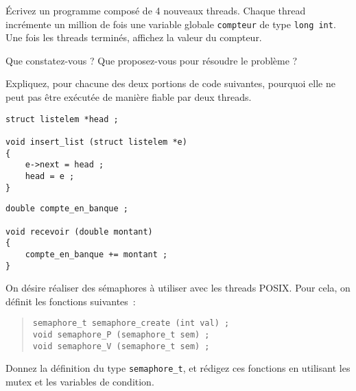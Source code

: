 \question	%

Écrivez un programme composé de 4 nouveaux threads. Chaque thread
incrémente un million de fois une variable globale \texttt {compteur}
de type \texttt {long int}. Une fois les threads terminés, affichez
la valeur du compteur.

Que constatez-vous ? Que proposez-vous pour résoudre le problème ?


\question

Expliquez, pour chacune des deux portions de code suivantes, pourquoi
elle ne peut pas être exécutée de manière fiable par deux threads.

\hfill
\begin {minipage} [t] {0.45\linewidth}
    \small
    \begin {verbatim}
struct listelem *head ;

void insert_list (struct listelem *e)
{
    e->next = head ;
    head = e ;
}
\end{verbatim}
\end {minipage}
\hfill
\begin {minipage} [t] {0.45\linewidth}
    \small
    \begin {verbatim}
double compte_en_banque ;

void recevoir (double montant)
{
    compte_en_banque += montant ;
}
\end{verbatim}
\end {minipage}


\question

On désire réaliser des sémaphores à utiliser avec les threads POSIX.
Pour cela, on définit les fonctions suivantes~:

\begin {quote}
\begin {verbatim}
semaphore_t semaphore_create (int val) ;
void semaphore_P (semaphore_t sem) ;
void semaphore_V (semaphore_t sem) ;
\end{verbatim}
\end {quote}

Donnez la définition du type \verb|semaphore_t|, et rédigez ces fonctions
en utilisant les mutex et les variables de condition.
